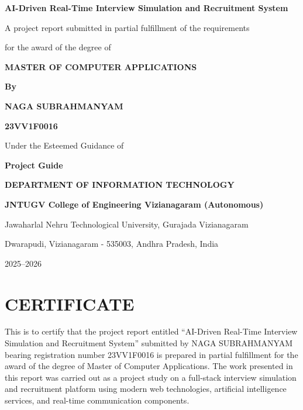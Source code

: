 \documentclass[12pt,a4paper]{report}
\begin{document}
\begin{titlepage}
\centering
\vspace*{0.4cm}
{\Large\bfseries AI-Driven Real-Time Interview Simulation and Recruitment System\par}
\vspace{1.2cm}
{\large A project report submitted in partial fulfillment of the requirements\par}
{\large for the award of the degree of\par}
\vspace{0.5cm}
{\Large\bfseries MASTER OF COMPUTER APPLICATIONS\par}
\vspace{1.0cm}
{\large\bfseries By\par}
\vspace{0.25cm}
{\Large\bfseries NAGA SUBRAHMANYAM\par}
{\large\bfseries 23VV1F0016\par}
\vspace{1.0cm}
{\large Under the Esteemed Guidance of\par}
{\large\bfseries Project Guide\par}
\vfill
{\large\bfseries DEPARTMENT OF INFORMATION TECHNOLOGY\par}
\vspace{0.25cm}
{\large\bfseries JNTUGV College of Engineering Vizianagaram (Autonomous)\par}
{\large Jawaharlal Nehru Technological University, Gurajada Vizianagaram\par}
{\large Dwarapudi, Vizianagaram - 535003, Andhra Pradesh, India\par}
\vspace{0.5cm}
{\large 2025--2026\par}
\end{titlepage}

\chapter*{CERTIFICATE}
\justifying
This is to certify that the project report entitled ``AI-Driven Real-Time Interview Simulation and Recruitment System'' submitted by NAGA SUBRAHMANYAM bearing registration number 23VV1F0016 is prepared in partial fulfillment for the award of the degree of Master of Computer Applications. The work presented in this report was carried out as a project study on a full-stack interview simulation and recruitment platform using modern web technologies, artificial intelligence services, and real-time communication components.
\end{document}
